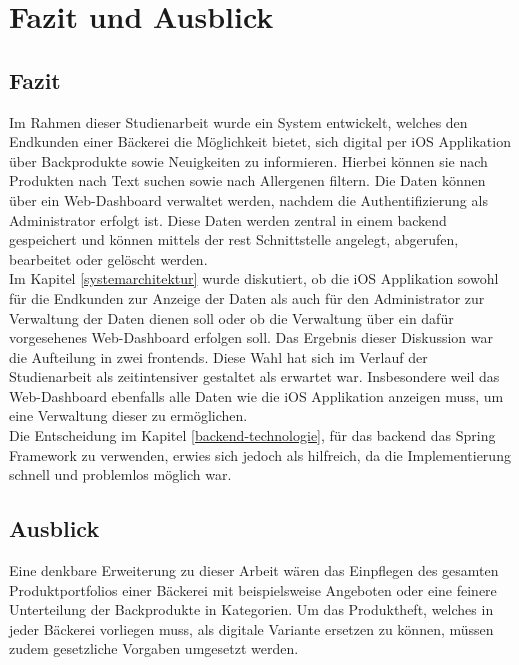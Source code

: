 \chapter{Fazit und Ausblick}

\section{Fazit}
Im Rahmen dieser Studienarbeit wurde ein System entwickelt, welches den Endkunden einer Bäckerei die Möglichkeit bietet, sich digital per iOS Applikation über Backprodukte sowie Neuigkeiten zu informieren. Hierbei können sie nach Produkten nach Text suchen sowie nach Allergenen filtern. Die Daten können über ein Web-Dashboard verwaltet werden, nachdem die Authentifizierung als Administrator erfolgt ist. Diese Daten werden zentral in einem \gls{backend} gespeichert und können mittels der \gls{rest} Schnittstelle angelegt, abgerufen, bearbeitet oder gelöscht werden.
\\
Im Kapitel \ref{systemarchitektur} wurde diskutiert, ob die iOS Applikation sowohl für die Endkunden zur Anzeige der Daten als auch für den Administrator zur Verwaltung der Daten dienen soll oder ob die Verwaltung über ein dafür vorgesehenes Web-Dashboard erfolgen soll. Das Ergebnis dieser Diskussion war die Aufteilung in zwei \gls{frontend}s. Diese Wahl hat sich im Verlauf der Studienarbeit als zeitintensiver gestaltet als erwartet war. Insbesondere weil das Web-Dashboard ebenfalls alle Daten wie die iOS Applikation anzeigen muss, um eine Verwaltung dieser zu ermöglichen.
\\
Die Entscheidung im Kapitel \ref{backend-technologie}, für das \gls{backend} das Spring Framework zu verwenden, erwies sich jedoch als hilfreich, da die Implementierung schnell und problemlos möglich war.

\section{Ausblick}
Eine denkbare Erweiterung zu dieser Arbeit wären das Einpflegen des gesamten Produktportfolios einer Bäckerei mit beispielsweise Angeboten oder eine feinere Unterteilung der Backprodukte in Kategorien.
Um das Produktheft, welches in jeder Bäckerei vorliegen muss, als digitale Variante ersetzen zu können, müssen zudem gesetzliche Vorgaben umgesetzt werden.
